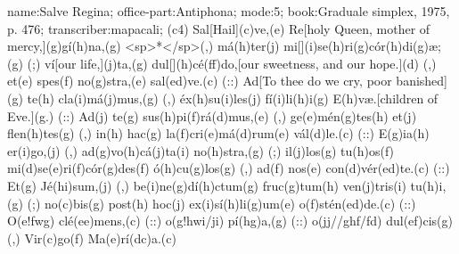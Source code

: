 name:Salve Regina;
office-part:Antiphona;
mode:5;
book:Graduale simplex, 1975, p. 476;
transcriber:mapacali;
(c4) Sal[Hail](c)ve,(e) Re[holy Queen, mother of mercy,](g)gí(h)na,(g) <sp>*</sp>(,) má(h)ter(j) mi[](i)se(h)ri(g)cór(h)di(g)æ;(g) (;) ví[our life,](j)ta,(g) dul[](h)cé(ff)do,[our sweetness, and our hope.](d) (,) et(e) spes(f) no(g)stra,(e) sal(ed)ve.(c) (::) Ad[To thee do we cry, poor banished](g) te(h) cla(i)má(j)mus,(g) (,) éx(h)su(i)les(j) fí(i)li(h)i(g) E(h)væ.[children of Eve.](g.) (::) Ad(j) te(g) sus(h)pi(f)rá(d)mus,(e) (,) ge(e)mén(g)tes(h) et(j) flen(h)tes(g) (,) in(h) hac(g) la(f)cri(e)má(d)rum(e) vál(d)le.(c) (::) E(g)ia(h) er(i)go,(j) (,) ad(g)vo(h)cá(j)ta(i) no(h)stra,(g) (;) il(j)los(g) tu(h)os(f) mi(d)se(e)ri(f)cór(g)des(f) ó(h)cu(g)los(g) (,) ad(f) nos(e) con(d)vér(ed)te.(c) (::) Et(g) Jé(hi)sum,(j) (,) be(i)ne(g)dí(h)ctum(g) fruc(g)tum(h) ven(j)tris(i) tu(h)i,(g) (;) no(c)bis(g) post(h) hoc(j) ex(i)sí(h)li(g)um(e) o(f)stén(ed)de.(c) (::) O(e!fwg) clé(ee)mens,(c) (::) o(g!hwi/ji) pí(hg)a,(g) (::) o(jj//ghf/fd) dul(ef)cis(g) (,) Vir(c)go(f) Ma(e)rí(dc)a.(c) 